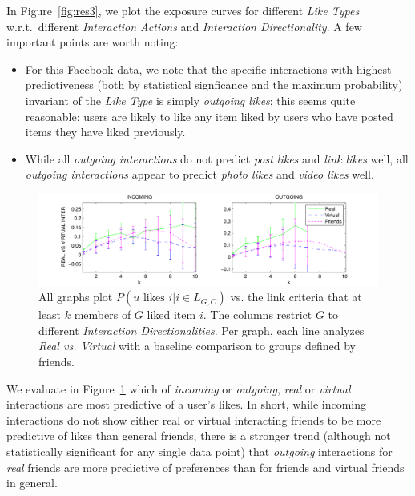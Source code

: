 In Figure~\ref{fig:res3}, we plot the exposure curves for 
different \textit{Like Types} 
 w.r.t.\ different \textit{Interaction Actions} and
\textit{Interaction Directionality}.  A few important points
are worth noting:
\begin{itemize}
\item For this Facebook data, we note that the specific interactions
with highest predictiveness (both by statistical signficance and the
maximum probability) invariant of the \textit{Like Type} is simply
\emph{outgoing likes}; this seems quite reasonable: users are
likely to like any item liked by users who have posted items they have
liked previously.
\item While all \emph{outgoing interactions} do not predict \emph{post
likes} and \emph{link likes} well, all \emph{outgoing interactions}
appear to predict \emph{photo likes} and \emph{video likes} well.
\end{itemize}

\begin{figure}[t!]
\centering
\includegraphics[scale=0.75]{data/real_vs_virtual_fix}
\vspace{-7mm}
\caption{All graphs plot $P(u \mbox{ likes } i | i \in L_{G,C})$
vs. the link criteria that at least $k$ members of $G$ liked item $i$.
The columns restrict $G$ to different 
\textit{Interaction Directionalities}.  Per graph, each line 
analyzes \textit{Real vs. Virtual} with
a baseline comparison to groups defined by friends.}
\label{fig:res4}
\end{figure}

We evaluate in Figure~\ref{fig:res4} which of \emph{incoming} or
\emph{outgoing}, \emph{real} or \emph{virtual} interactions are most
predictive of a user's likes.  In short, while incoming interactions
do not show either real or virtual interacting friends 
to be more predictive of likes than general friends, there is
a stronger trend (although not statistically significant for
any single data point) that \emph{outgoing} interactions for 
\emph{real} friends are more predictive of preferences
than for friends and virtual friends in general. 

